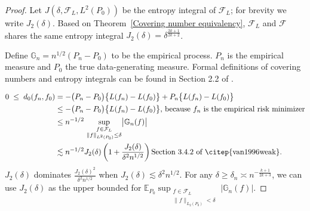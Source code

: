 \begin{proof}
Let \( J(\delta, \mathcal{F}_L, L^2(P_0)) \) be the entropy integral of $\mathcal{F}_L$; for brevity we write \(J_2(\delta)\). Based on Theorem~\ref{Covering number equivalency}, $\mathcal{F}_L$ and $\mathcal{F}$ shares the same entropy integral \(J_2(\delta) = \delta^\frac{2k+1}{2k+2}\).

Define \( \mathbb{G}_n = n^{1/2} (P_n - P_0) \) to be the empirical process. \(P_{n}\) is the empirical measure and
\(P_{0}\) the true data-generating measure. Formal definitions of covering numbers and entropy integrals can be found in
Section 2.2 of \citet{van1996weak}.

\begin{align}
0
\;\le\;
d_{0}(f_{n},f_{0})
&= -\bigl(P_{n}-P_{0}\bigr)\bigl\{L(f_{n})-L(f_{0})\bigr\}
    + P_{n}\bigl\{L(f_{n})-L(f_{0})\bigr\} \notag\\
&\le -\bigl(P_{n}-P_{0}\bigr)\bigl\{L(f_{n})-L(f_{0})\bigr\} \text{, because $f_n$ is the empirical risk minimizer} \notag\\ 
&\le n^{-1/2}\,
   \sup_{\substack{f\in\mathcal F_{L}\\ \lVert f\rVert_{L^{2}(P_{0})}\leq\delta}}
   \bigl\lvert \mathbb{G}_{n}(f) \bigr\rvert \notag \\
&\lesssim n^{-1/2} J_2(\delta) \left( 1 + \frac{J_2(\delta)}{\delta^2 n^{1/2}} \right) \text{Section 3.4.2 of \citep{van1996weak}.}  \notag
\end{align}
\( J_2(\delta) \) dominates \( \frac{J_2(\delta)^2}{\delta^2 n^{1/2}} \) when \( J_2(\delta) \lesssim \delta^2 n^{1/2} \). For any \( \delta \geq \delta_n \asymp n^{-\frac{k+1}{2k+3}} \), we can use \( J_2(\delta) \) as the upper bounded for \( \mathbb{E}_{P_0}\sup_{\substack{f\in\mathcal F_{L}\\ \lVert f\rVert_{L_{2}(P_{0})}<\delta}}
   \bigl\lvert \mathbb{G}_{n}(f) \bigr\rvert\).


\end{proof}
